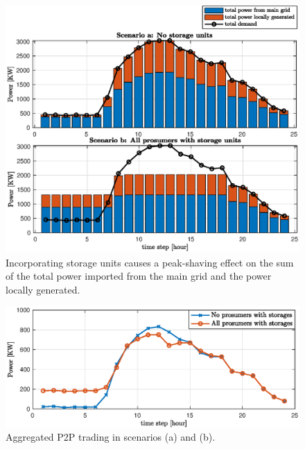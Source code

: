 \documentclass{IEEEtran}  %
\newcommand{\0}{\mathbf{0}}
\newcommand{\1}{\mathbf{1}}
\begin{document}
%
%

\begin{figure}[t]
	\centering
	\includegraphics[width=0.9\linewidth]{figures/simB_0402_pt1_v3a}
	\caption{	Incorporating storage units causes a peak-shaving effect on the sum of the total power imported from the main grid and the power locally generated.}
	\label{fig:sim_B1}
\end{figure}
\begin{figure}[t]
	\centering 
	\includegraphics[width=0.9\linewidth]{figures/simB_0402_pt2_v4a}
	\caption{Aggregated P2P trading in scenarios (a) and (b).
	}
	\label{fig:sim_B2}
\end{figure}  
\end{document}
